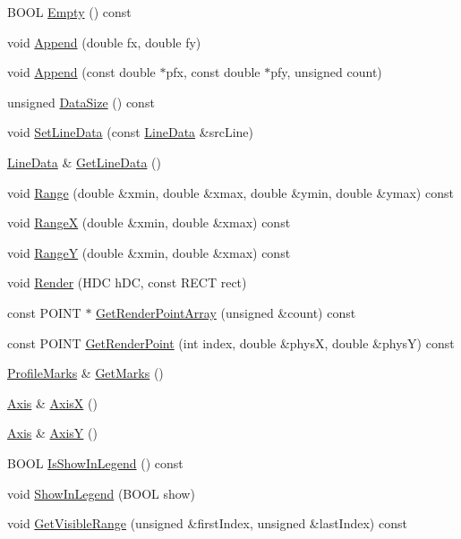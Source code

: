 \begin{DoxyCompactItemize}
\item 
B\-O\-O\-L \hyperlink{class_profile_abf535c50bda946ff73128a5d686d0d36}{Empty} () const 
\item 
void \hyperlink{class_profile_a5c65fe41c9872b365adec25e5dc0376d}{Append} (double fx, double fy)
\item 
void \hyperlink{class_profile_a8aede9dc40d7161d8e4f5e8e49a1894f}{Append} (const double $\ast$pfx, const double $\ast$pfy, unsigned count)
\item 
unsigned \hyperlink{class_profile_ac99b05caf969d1100a096872896decff}{Data\-Size} () const 
\item 
void \hyperlink{class_profile_a71927cb9bcbbe8a02947ffc25afdadd9}{Set\-Line\-Data} (const \hyperlink{class_line_data}{Line\-Data} \&src\-Line)
\item 
\hyperlink{class_line_data}{Line\-Data} \& \hyperlink{class_profile_a476640b07ed944d59dc55efe64fe15c7}{Get\-Line\-Data} ()
\item 
void \hyperlink{class_profile_a2bdae58cd0a58abcd2a7e51368a693b1}{Range} (double \&xmin, double \&xmax, double \&ymin, double \&ymax) const 
\item 
void \hyperlink{class_profile_ac0d79d6f6b2355fe6e13262319968368}{Range\-X} (double \&xmin, double \&xmax) const 
\item 
void \hyperlink{class_profile_af838a64a6376e9f083a621edd4604777}{Range\-Y} (double \&xmin, double \&xmax) const 
\item 
void \hyperlink{class_profile_a2d8f93d7a343455f9b8168220d1880d2}{Render} (H\-D\-C h\-D\-C, const R\-E\-C\-T rect)
\item 
const P\-O\-I\-N\-T $\ast$ \hyperlink{class_profile_af82006b877d02e4f5f725118f95fa59e}{Get\-Render\-Point\-Array} (unsigned \&count) const 
\item 
const P\-O\-I\-N\-T \hyperlink{class_profile_a83e9c9f23f67511b0bbd3aec4c256821}{Get\-Render\-Point} (int index, double \&phys\-X, double \&phys\-Y) const 
\item 
\hyperlink{class_profile_marks}{Profile\-Marks} \& \hyperlink{class_profile_ad11605c10819b4d259474ddc0a888334}{Get\-Marks} ()
\item 
\hyperlink{class_axis}{Axis} \& \hyperlink{class_profile_a0faa93dd60b346e486b2c1a084c05836}{Axis\-X} ()
\item 
\hyperlink{class_axis}{Axis} \& \hyperlink{class_profile_af891a7ad2f1f7508822c41e542e0edf2}{Axis\-Y} ()
\item 
B\-O\-O\-L \hyperlink{class_profile_a48a263ac82a825c8c0208bbb2532e5d9}{Is\-Show\-In\-Legend} () const 
\item 
void \hyperlink{class_profile_a69bc4295a958de5f72aa67ab70b3d036}{Show\-In\-Legend} (B\-O\-O\-L show)
\item 
void \hyperlink{class_profile_ac8069bd46802baa2c0fa53419425b159}{Get\-Visible\-Range} (unsigned \&first\-Index, unsigned \&last\-Index) const 
\end{DoxyCompactItemize}
